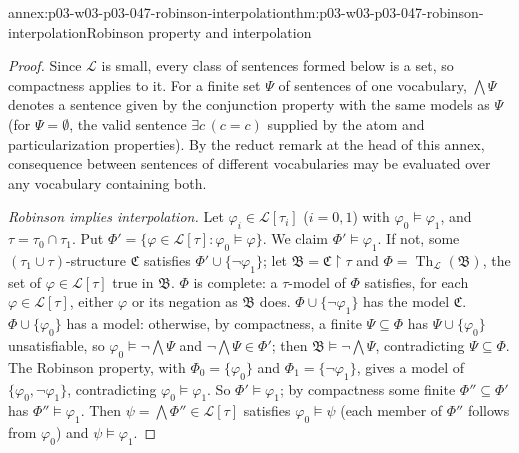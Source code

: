 \begin{annexitem}{annex:p03-w03-p03-047-robinson-interpolation}{thm:p03-w03-p03-047-robinson-interpolation}{Robinson property and interpolation}
\begin{proof}
Since \(\mathscr L\) is small, every class of sentences formed below is a
set, so compactness applies to it.  For a finite set \(\Psi\) of sentences
of one vocabulary, \(\bigwedge\Psi\) denotes a sentence given by the
conjunction property with the same models as \(\Psi\) (for
\(\Psi=\emptyset\), the valid sentence \(\exists c\,(c=c)\) supplied by the
atom and particularization properties).  By the reduct remark at the head of this annex, consequence
between sentences of different vocabularies may be evaluated over any
vocabulary containing both.

\emph{Robinson implies interpolation.}  Let \(\varphi_i\in\mathscr L[\tau_i]\)
(\(i=0,1\)) with \(\varphi_0\models\varphi_1\), and \(\tau=\tau_0\cap\tau_1\).
Put \(\Phi'=\{\varphi\in\mathscr L[\tau]:\varphi_0\models\varphi\}\).  We
claim \(\Phi'\models\varphi_1\).  If not, some
\((\tau_1\cup\tau)\)-structure \(\mathfrak C\) satisfies
\(\Phi'\cup\{\neg\varphi_1\}\); let \(\mathfrak B=\mathfrak C\restriction\tau\)
and \(\Phi=\operatorname{Th}_{\mathscr L}(\mathfrak B)\), the set of
\(\varphi\in\mathscr L[\tau]\) true in \(\mathfrak B\).  \(\Phi\) is
complete: a \(\tau\)-model of \(\Phi\) satisfies, for each
\(\varphi\in\mathscr L[\tau]\), either \(\varphi\) or its negation as
\(\mathfrak B\) does.  \(\Phi\cup\{\neg\varphi_1\}\) has the model
\(\mathfrak C\).  \(\Phi\cup\{\varphi_0\}\) has a model: otherwise, by
compactness, a finite \(\Psi\subseteq\Phi\) has \(\Psi\cup\{\varphi_0\}\)
unsatisfiable, so \(\varphi_0\models\neg\bigwedge\Psi\) and
\(\neg\bigwedge\Psi\in\Phi'\); then \(\mathfrak B\models\neg\bigwedge\Psi\),
contradicting \(\Psi\subseteq\Phi\).  The Robinson property, with
\(\Phi_0=\{\varphi_0\}\) and \(\Phi_1=\{\neg\varphi_1\}\), gives a model of
\(\{\varphi_0,\neg\varphi_1\}\), contradicting
\(\varphi_0\models\varphi_1\).  So \(\Phi'\models\varphi_1\); by
compactness some finite \(\Phi''\subseteq\Phi'\) has
\(\Phi''\models\varphi_1\).  Then \(\psi=\bigwedge\Phi''\in\mathscr L[\tau]\)
satisfies \(\varphi_0\models\psi\) (each member of \(\Phi''\) follows from
\(\varphi_0\)) and \(\psi\models\varphi_1\).


\end{proof}
\end{annexitem}
